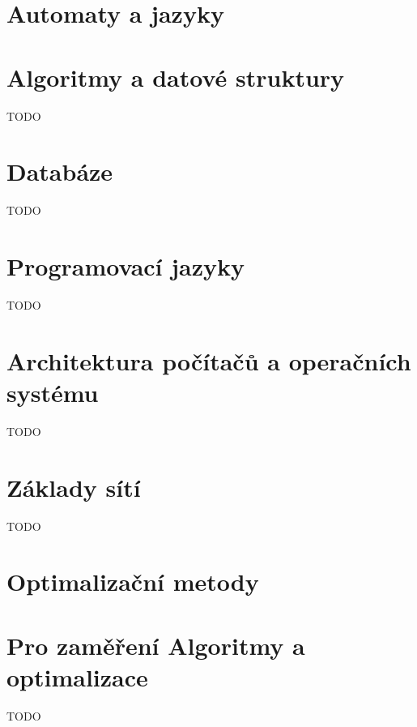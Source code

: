 


\section{Automaty a jazyky}


\section{Algoritmy a datové struktury}
TODO

\section{Databáze}
TODO

\section{Programovací jazyky}
TODO

\section{Architektura počítačů a operačních systému}
TODO

\section{Základy sítí}
TODO

\section{Optimalizační metody}


\section{Pro zaměření Algoritmy a optimalizace}
TODO

